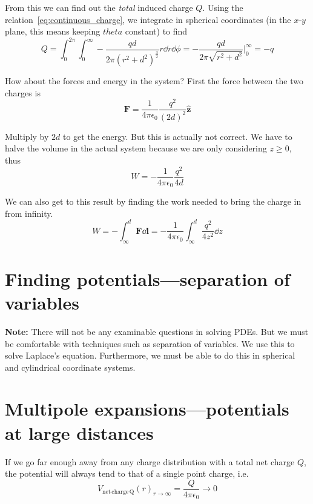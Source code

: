 \documentclass[12pt,chapterprefix=false,dvipsnames]{scrbook}
\theoremstyle{dotless}
\theoremstyle{definition}
\begin{document}
From this we can find out the \textit{total} induced
charge $Q$. Using the
relation~\ref{eq:continuous_charge}, we integrate in spherical
coordinates (in the
$x$-$y$ plane, this
means keeping $theta$ constant) to find
\begin{equation}
	Q = \int_0^{2\pi} \int^\infty_0 -
	\frac{qd}{2\pi{(r^2+d^2)}^{\frac{3}{2}}}
	r\dd{r}\dd{\phi} =
	-\frac{qd}{2\pi\sqrt{r^2+d^2}}\biggr \rvert_0^\infty = -q
\end{equation}

How about the forces and energy in the system? First the force
between the two charges is
\begin{equation}
	\bm{F} =
	\frac{1}{4\pi\epsilon_{0}}\frac{q^2}{{{(2d)}^2}}
	\hat{ \bm{z}  }
\end{equation}

Multiply by $2d$ to get the energy. But this
is actually not correct. We have to halve the volume in the
actual system because we are only considering
$z \geq 0$, thus
\begin{equation}
	W = -\frac{1}{4\pi\epsilon_{0}}\frac{q^2}{4d}
\end{equation}

We can also get to this result by finding the work needed to
bring the charge in from infinity.
\begin{equation}
	W = -\int_\infty^d \bm{F}
	\dd{ \bm{l}  } = -\frac{1}{4\pi\epsilon_{0}} \int_\infty^d
	\frac{q^2}{4z^2} \dd{z}
\end{equation}

\section{Finding potentials---separation of variables}%
\label{sec:finding_potentials_separation_of_variables}

\textbf{Note:} There will not be any examinable
questions in solving PDEs. But we must be comfortable with
techniques such as separation of variables. We use this to solve
Laplace's equation. Furthermore, we must be able to do this in
spherical and cylindrical coordinate systems.

\section{Multipole expansions---potentials at large distances}%
\label{sec:multipole_expansions_potentials_at_large_distances}

If we go far enough away from any charge distribution with a
total net charge $Q$, the potential will
always tend to that of a single point charge, i.e.
\begin{equation}
	V_{\mathrm{net\,charge\,Q}}{\left(r\right)}_{r
	\rightarrow \infty} = \frac{Q}{4\pi\epsilon_{0}} \rightarrow 0
\end{equation}
\end{document}

